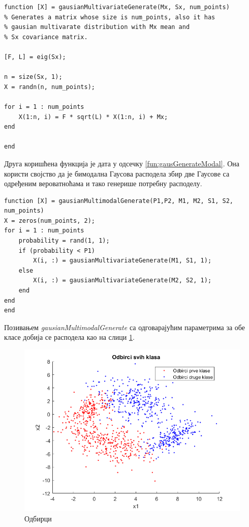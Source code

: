 \begin{lstlisting}[caption={Вишеваријабална Гаусова расподела-генерисање},label={fun:gausGenerate}]
function [X] = gausianMultivariateGenerate(Mx, Sx, num_points)
% Generates a matrix whose size is num_points, also it has 
% gausian multivarate distribution with Mx mean and 
% Sx covariance matrix. 

[F, L] = eig(Sx);

n = size(Sx, 1);
X = randn(n, num_points);

for i = 1 : num_points
    X(1:n, i) = F * sqrt(L) * X(1:n, i) + Mx; 
end

end
\end{lstlisting}

Друга коришћена функција је дата у одсечку  \ref{fun:gausGenerateModal}. Она користи својство да је бимодална Гаусова расподела збир две Гаусове са одређеним вероватноћама и тако генерише потребну расподелу. 

\begin{lstlisting}[caption={Вишеваријабална мултимодална Гаусова расподела-генерисање},label={fun:gausGenerateModal}]
function [X] = gausianMultimodalGenerate(P1,P2, M1, M2, S1, S2, num_points)
X = zeros(num_points, 2);
for i = 1 : num_points
    probability = rand(1, 1);
    if (probability < P1)
        X(i, :) = gausianMultivariateGenerate(M1, S1, 1);
    else
        X(i, :) = gausianMultivariateGenerate(M2, S2, 1);
    end
end
end
\end{lstlisting}
Позивањем \emph{gausianMultimodalGenerate} са одговарајућим параметрима за обе класе добија се расподела као на слици \ref{fig:Odbirci}. 
\begin{figure}[htb!]
\includegraphics[scale=1]{pictures/2/Odbirci}
\caption{Одбирци}\label{fig:Odbirci}
\end{figure}


